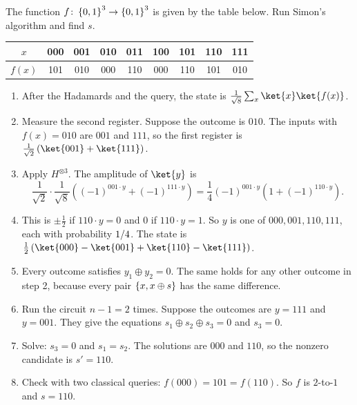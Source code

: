 \begin{exercisebox}
\begin{pproblem}[Simon with $n = 3$]\label{pp:simon}
    The function $f \colon \left\lbrace0,1\right\rbrace^3 \to \left\lbrace0,1\right\rbrace^3$ is given by the table below. Run Simon's
    algorithm and find $s$.
    \begin{center}
        \begin{tabular}{c|cccccccc}
            $x$    & 000 & 001 & 010 & 011 & 100 & 101 & 110 & 111 \\ \hline
            $f(x)$ & 101 & 010 & 000 & 110 & 000 & 110 & 101 & 010
        \end{tabular}
    \end{center}
\end{pproblem}
\tcblower
\begin{wsolution}
    \leavevmode
    \begin{enumerate}
        \item After the Hadamards and the query, the state is
              $\frac{1}{\sqrt{8}} \sum_{x} \ket{x}\ket{f(x)}$.
        \item Measure the second register. Suppose the outcome is $010$. The inputs with
              $f(x) = 010$ are $001$ and $111$, so the first register is
              $\frac{1}{\sqrt{2}}\left(\ket{001} + \ket{111}\right)$.
        \item Apply $H^{\otimes 3}$. The amplitude of $\ket{y}$ is
              \[\frac{1}{\sqrt{2}} \cdot \frac{1}{\sqrt{8}} \left((-1)^{001 \cdot y} + (-1)^{111 \cdot y}\right)
                  = \frac{1}{4} (-1)^{001 \cdot y} \left(1 + (-1)^{110 \cdot y}\right).\]
        \item This is $\pm\frac{1}{2}$ if $110 \cdot y = 0$ and $0$ if $110 \cdot y = 1$. So $y$ is
              one of $000, 001, 110, 111$, each with probability $1/4$. The state is
              $\frac{1}{2}\left(\ket{000} - \ket{001} + \ket{110} - \ket{111}\right)$.
        \item Every outcome satisfies $y_1 \oplus y_2 = 0$. The same holds for any other outcome in
              step 2, because every pair $\left\lbrace x, x \oplus s\right\rbrace$ has the same difference.
        \item Run the circuit $n - 1 = 2$ times. Suppose the outcomes are $y = 111$ and $y = 001$.
              They give the equations $s_1 \oplus s_2 \oplus s_3 = 0$ and $s_3 = 0$.
        \item Solve: $s_3 = 0$ and $s_1 = s_2$. The solutions are $000$ and $110$, so the nonzero
              candidate is $s' = 110$.
        \item Check with two classical queries: $f(000) = 101 = f(110)$. So $f$ is $2$-to-$1$ and
              $s = 110$.
    \end{enumerate}


\end{wsolution}
\end{exercisebox}
